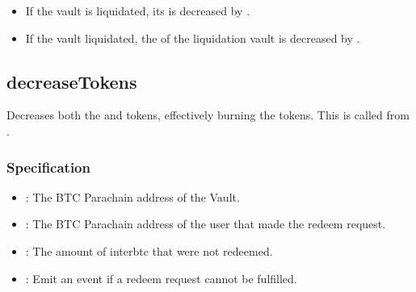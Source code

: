 \documentclass[a4paper,10pt,english]{sphinxmanual}
\begin{document}
\begin{itemize}
\item {} 
If the vault is  liquidated, its  is decreased by .

\item {} 
If the vault  liquidated, the  of the liquidation vault is decreased by .

\end{itemize}


\subsection{decreaseTokens}
\label{\detokenize{spec/vault-registry:decreasetokens}}\label{\detokenize{spec/vault-registry:id23}}
Decreases both the  and  tokens, effectively burning the tokens. This is called from {\hyperref[\detokenize{spec/redeem:cancelredeem}]{}}.


\subsubsection{Specification}
\label{\detokenize{spec/vault-registry:id24}}


\begin{itemize}
\item {} 
: The BTC Parachain address of the Vault.

\item {} 
: The BTC Parachain address of the user that made the redeem request.

\item {} 
: The amount of interbtc that were not redeemed.

\end{itemize}

\begin{itemize}
\item {} 
: Emit an event if a redeem request cannot be fulfilled.

\end{itemize}
\end{document}
